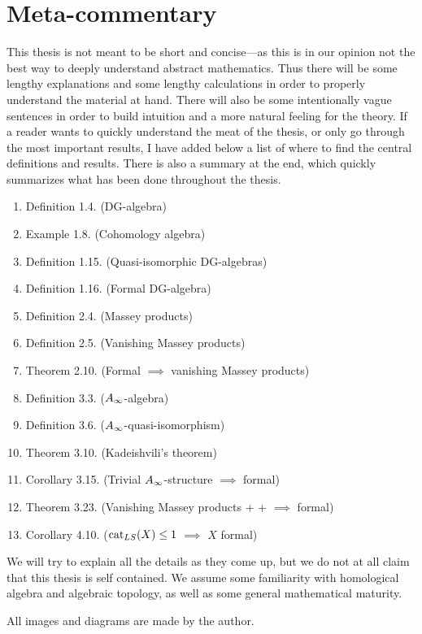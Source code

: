 

\section{Meta-commentary}

This thesis is not meant to be short and concise---as this is in our opinion not the best way to deeply understand abstract mathematics. Thus there will be some lengthy explanations and some lengthy calculations in order to properly understand the material at hand. There will also be some intentionally vague sentences in order to build intuition and a more natural feeling for the theory. If a reader wants to quickly understand the meat of the thesis, or only go through the most important results, I have added below a list of where to find the central definitions and results. There is also a summary at the end, which quickly summarizes what has been done throughout the thesis. 

\begin{enumerate}
	\item Definition 1.4. (DG-algebra)
	\item Example 1.8. (Cohomology algebra)
	\item Definition 1.15. (Quasi-isomorphic DG-algebras)
	\item Definition 1.16. (Formal DG-algebra)
	\item Definition 2.4. (Massey products)
	\item Definition 2.5. (Vanishing Massey products)
	\item Theorem 2.10. (Formal $\implies$ vanishing Massey products)
	\item Definition 3.3. ($A_{\infty}$-algebra)
	\item Definition 3.6. ($A_{\infty}$-quasi-isomorphism)
	\item Theorem 3.10. (Kadeishvili's theorem)
	\item Corollary 3.15. (Trivial $A_{\infty}$-structure $\implies$ formal)
	\item Theorem 3.23. (Vanishing Massey products + + $\implies$ formal)
	\item Corollary 4.10. ($\text{cat}_{LS}(X)\leq 1$ $\implies$ $X$ formal)
\end{enumerate}

We will try to explain all the details as they come up, but we do not at all claim that this thesis is self contained. We assume some familiarity with homological algebra and algebraic topology, as well as some general mathematical maturity. 

All images and diagrams are made by the author. 